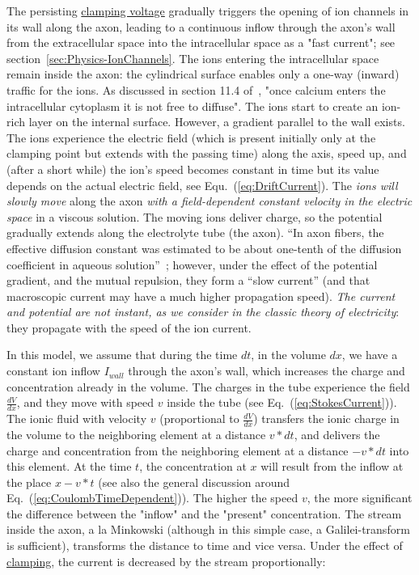The persisting \hyperlink{voltage-clamping}{clamping voltage} gradually triggers the opening of ion channels in its wall along the axon,
leading to a continuous inflow through the axon's
wall from the extracellular space into the intracellular space as a "fast current"; see section~\ref{sec:Physics-IonChannels}.
The ions entering the intracellular space remain inside the axon: the cylindrical surface enables only a one-way (inward) traffic for the ions. As
discussed in section 11.4 of~\cite{KochBiophysics:1999}, "once
calcium enters the intracellular cytoplasm it is not free to diffuse". The ions start to create an ion-rich layer on the internal surface.
However, a gradient parallel to the wall exists. The ions experience the electric field (which is present initially
only at the clamping point but extends with the passing time) along the axis, speed up, and (after a short while) the ion's
speed becomes constant in time but its value depends on the actual electric
field, see Equ.~(\ref{eq:DriftCurrent}). The \emph{ions will slowly
	move }along the axon \emph{with a field-dependent constant velocity
	in the electric space} in a viscous solution.
The moving ions deliver charge, so
the potential gradually extends along the electrolyte tube (the axon).
 ``In axon fibers, the
effective diffusion constant was estimated to be about one-tenth of
the diffusion coefficient in aqueous solution''~\cite{KochBiophysics:1999}; however, under the effect of the potential gradient, and the mutual repulsion,
they form a ``slow current'' (and that macroscopic current may have a much higher propagation speed). 
\emph{The current and potential are not instant, as we consider in
	the classic theory of electricity}: they propagate with the speed
of the ion current.



In this model, we assume that during the time $dt$, in the volume
$dx$, we have a constant ion inflow $I_{wall}$ through the axon's
wall, which increases the charge and concentration already in the
volume. The charges in the tube experience the field $\frac{dV}{dx}$,
and they move with speed $v$ inside the tube (see Eq.~(\ref{eq:StokesCurrent})).
The ionic fluid with velocity $v$ (proportional
to $\frac{dV}{dx}$) transfers the ionic charge in
the volume to the neighboring element at a distance $v*dt$, and delivers
the charge and concentration from the neighboring element at a distance $-v*dt$ into
this element. At the time $t$, the concentration at $x$ will result
from the inflow at the place $x-v*t$ (see also the general discussion
around Eq.~(\ref{eq:CoulombTimeDependent})). The higher the speed 
$v$, the more significant the difference between the "inflow" and the "present"
concentration. The stream inside the axon, a la Minkowski
(although in this simple case, a Galilei-transform is sufficient), transforms
the distance to time and vice versa.
	Under the effect of \hyperlink{voltage-clamping}{clamping}, the current is decreased by the stream
proportionally:

